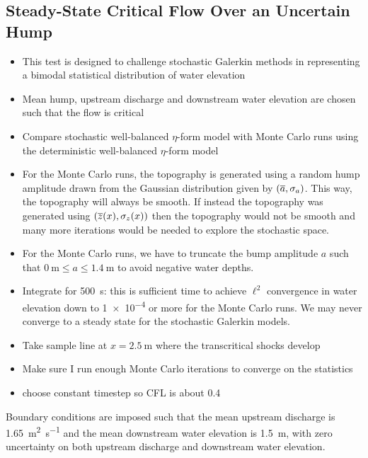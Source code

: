 \subsection{Steady-State Critical Flow Over an Uncertain Hump}

\begin{itemize}
    \item This test is designed to challenge stochastic Galerkin methods in representing a bimodal statistical distribution of water elevation
    \item Mean hump, upstream discharge and downstream water elevation are chosen such that the flow is critical
    \item Compare stochastic well-balanced $\eta$-form model with Monte Carlo runs using the deterministic well-balanced $\eta$-form model
    \item For the Monte Carlo runs, the topography is generated using a random hump amplitude drawn from the Gaussian distribution given by $(\overline{a}, \sigma_a)$.  This way, the topography will always be smooth.  If instead the topography was generated using $(\overline{z}(x), \sigma_z(x))$ then the topography would not be smooth and many more iterations would be needed to explore the stochastic space.
    \item For the Monte Carlo runs, we have to truncate the bump amplitude $a$ such that $\SI{0}{\meter} \leq a \leq \SI{1.4}{\meter}$ to avoid negative water depths.
    \item Integrate for \SI{500}{\second}: this is sufficient time to achieve $\ell^2$ convergence in water elevation down to \num{1e-4} or more for the Monte Carlo runs.  We may never converge to a steady state for the stochastic Galerkin models.
    \item Take sample line at $x = \SI{2.5}{\meter}$ where the transcritical shocks develop
    \item Make sure I run enough Monte Carlo iterations to converge on the statistics
    \item choose constant timestep so CFL is about 0.4
\end{itemize}

Boundary conditions are imposed such that the mean upstream discharge is \SI{1.65}{\meter\squared\per\second} and the mean downstream water elevation is \SI{1.5}{\meter}, with zero uncertainty on both upstream discharge and downstream water elevation.

